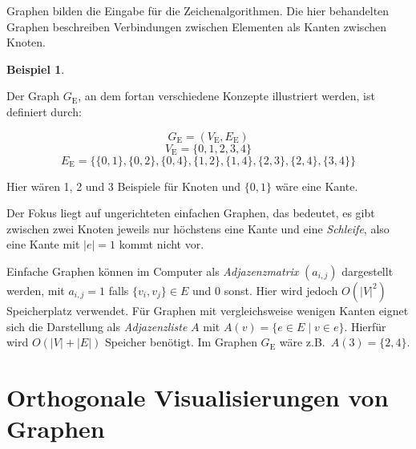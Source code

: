 \documentclass[a4paper]{scrreprt}
\theoremstyle{definition}
\newtheorem{example}[satz]{Beispiel}
\begin{document}
Graphen bilden die Eingabe für die Zeichenalgorithmen. Die hier behandelten Graphen beschreiben Verbindungen zwischen Elementen als Kanten zwischen Knoten. 

\begin{example}
  \label{ex:graph}

Der Graph $G_\text{E}$, an dem fortan verschiedene Konzepte illustriert werden, ist definiert durch:

\[G_\text{E} = (V_\text{E}, E_\text{E})\]
\[V_\text{E} = \{0, 1, 2, 3, 4\}\]
\[E_\text{E} = \{\{0, 1\}, \{0, 2\}, \{0, 4\}, \{1, 2\}, \{1, 4\}, \{2, 3\}, \{2, 4\}, \{3, 4\}\}\]

Hier wären 1, 2 und 3 Beispiele für Knoten und $\{0, 1\}$ wäre eine Kante.
\end{example}

Der Fokus liegt auf ungerichteten einfachen Graphen, das bedeutet, es gibt zwischen zwei Knoten jeweils nur höchstens eine Kante und eine \emph{Schleife}, also eine Kante mit $|e| = 1$ kommt nicht vor.

Einfache Graphen können im Computer als \emph{Adjazenzmatrix} $(a_{i,j})$ dargestellt werden, mit $a_{i,j} = 1$ falls $\{v_i, v_j\} \in E$ und $0$ sonst. Hier wird jedoch $O(|V|^2)$ Speicherplatz verwendet. Für Graphen mit vergleichsweise wenigen Kanten eignet sich die Darstellung als \emph{Adjazenzliste} $A$ mit $A(v) = \{e \in E \mid v \in e\}$. Hierfür wird $O(|V| + |E|)$ Speicher benötigt. Im Graphen $G_\text{E}$ wäre z.B.\ $A(3) = \{2,4\}$. %

\section{Orthogonale Visualisierungen von Graphen}
\label{sec:orthogonalDrawings}
\end{document}
